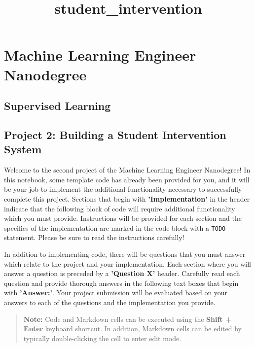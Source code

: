 \documentclass[11pt]{article}
\title{student\_intervention}
\begin{document}
    
    
    \maketitle
    
    

    
    \section{Machine Learning Engineer
Nanodegree}\label{machine-learning-engineer-nanodegree}

\subsection{Supervised Learning}\label{supervised-learning}

\subsection{Project 2: Building a Student Intervention
System}\label{project-2-building-a-student-intervention-system}

    Welcome to the second project of the Machine Learning Engineer
Nanodegree! In this notebook, some template code has already been
provided for you, and it will be your job to implement the additional
functionality necessary to successfully complete this project. Sections
that begin with \textbf{'Implementation'} in the header indicate that
the following block of code will require additional functionality which
you must provide. Instructions will be provided for each section and the
specifics of the implementation are marked in the code block with a
\texttt{\textquotesingle{}TODO\textquotesingle{}} statement. Please be
sure to read the instructions carefully!

In addition to implementing code, there will be questions that you must
answer which relate to the project and your implementation. Each section
where you will answer a question is preceded by a \textbf{'Question X'}
header. Carefully read each question and provide thorough answers in the
following text boxes that begin with \textbf{'Answer:'}. Your project
submission will be evaluated based on your answers to each of the
questions and the implementation you provide.

\begin{quote}
\textbf{Note:} Code and Markdown cells can be executed using the
\textbf{Shift + Enter} keyboard shortcut. In addition, Markdown cells
can be edited by typically double-clicking the cell to enter edit mode.
\end{quote}
\end{document}
